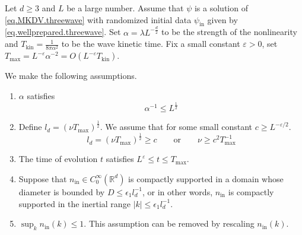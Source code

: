 \begin{thm}\label{th.main}
Let $d\ge 3$ and $L$ be a large number. Assume that $\psi$ is a solution of \eqref{eq.MKDV.threewave} with randomized initial data $\psi_{\mathrm{in}}$ given by \eqref{eq.wellprepared.threewave}. Set $\alpha=\lambda L^{-\frac{d}{2}}$ to be the strength of the nonlinearity and $T_{\mathrm{kin}}=\frac{1}{8\pi\alpha^2}$ to be the wave kinetic time. Fix a small constant $\varepsilon> 0$, set $T_{\text{max}} = L^{-\varepsilon} \alpha^{-2}=O(L^{-\varepsilon}T_{\mathrm{kin}})$. 

We make the following assumptions. 
\begin{enumerate}
    \item $\alpha$ satisfies
    \begin{equation}\label{eq.conditionalpha.threewave}
        \alpha^{-1}\le L^{\frac{1}{2}}
    \end{equation}
    \item Define $l_{d}=(\nu T_{\mathrm{max}})^{\frac{1}{2}}$. We assume that for some small constant $c\ge L^{-\varepsilon/2}$.
    \begin{equation}\label{eq.conditionnu.threewave}
        l_{d}=(\nu T_{\mathrm{max}})^{\frac{1}{2}}\ge c \qquad \text{or}\qquad
        \nu\ge c^2T^{-1}_{\text{max}}
    \end{equation}
    \item The time of evolution $t$ satisfies $L^{\varepsilon} \leq t \leq T_{\text{max}}$.
    \item Suppose that $n_{\mathrm{in}} \in C^\infty_0(\mathbb{R}^d)$ is compactly supported in a domain whose diameter is bounded by $D\le \epsilon_1l_d^{-1}$, or in other words, $n_{\mathrm{in}}$ is compactly supported in the inertial range $|k|\le \epsilon_1 l_{d}^{-1}$. 

    \item $\sup_{k}n_{\mathrm{in}}(k)\le 1$. This assumption can be removed by rescaling $n_{\mathrm{in}}(k)$.
\end{enumerate}


\end{thm}
